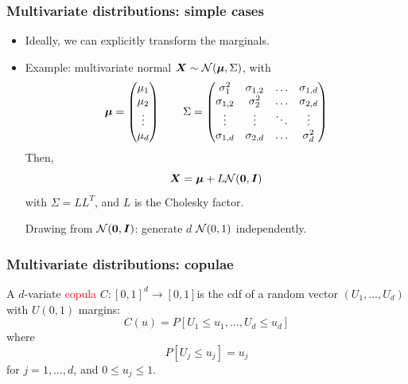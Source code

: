 \documentclass{beamer}
\begin{document}
\begin{frame}
\frametitle{Multivariate distributions: simple cases}

\begin{itemize}
\item 
Ideally, we can explicitly transform the marginals.
\item
Example: multivariate normal ${\boldsymbol{X}} \sim {\mathcal{N}}({\boldsymbol{\mu}}, \Sigma)$, with
$$
{\boldsymbol{\mu}} =
\begin{pmatrix}
	\mu_1 \\ \mu_2 \\ \vdots \\ \mu_d
\end{pmatrix}
\qquad
\Sigma = 
\begin{pmatrix}
	\sigma^2_1 & \sigma_{1,2} & \ldots & \sigma_{1,d} \\
	\sigma_{1,2} & \sigma^2_2 & \ldots & \sigma_{2,d} \\
	\vdots & \vdots & \ddots & \vdots \\
	\sigma_{1,d} & \sigma_{2,d} & \ldots & \sigma^2_d 
\end{pmatrix}
$$
Then,
$$
{\boldsymbol{X}} = {\boldsymbol{\mu}} + L{\mathcal{N}}({\boldsymbol{0}}, {\boldsymbol{I}})
$$
with $\Sigma = LL^T$, and $L$ is the Cholesky factor.

Drawing from ${\mathcal{N}}({\boldsymbol{0}},{\boldsymbol{I}})$: generate $d$ ${\mathcal{N}}(0,1)$ independently.
\end{itemize}
		
\end{frame}

\begin{frame}
\frametitle{Multivariate distributions: copulae}

A $d$-variate \textcolor{red}{copula} $C: [0, 1]^d \rightarrow [0, 1] $is the cdf of a random vector
$(U_1,\ldots, U_d)$ with $U(0, 1)$ margins:
$$
C(u) = P[U_1 \leq u_1,\ldots, U_d \leq u_d]
$$
where
$$
P[U_j \leq u_j] = u_j
$$
for $j = 1,\ldots,d$, and $0 \leq u_j \leq 1$.

\end{frame}
\end{document}
